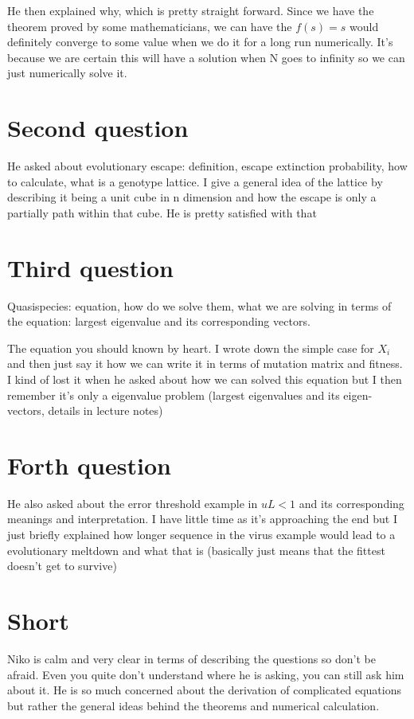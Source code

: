 \documentclass[a4paper,12pt]{article}
\begin{document}
He then explained why, which is pretty straight forward. Since we have the theorem proved by some mathematicians, we can have the $f(s) = s$ would definitely converge to some value when we do it for a long run numerically. It's because we are certain this will have a solution when N goes to infinity so we can just numerically solve it.

\section{Second question}
He asked about evolutionary escape: definition, escape extinction probability, how to calculate, what is a genotype lattice. I give a general idea of the lattice by describing it being a unit cube in n dimension and how the escape is only a partially path within that cube. He is pretty satisfied with that

\section{Third question}
Quasispecies: equation, how do we solve them, what we are solving in terms of the equation: largest eigenvalue and its corresponding vectors.

The equation you should known by heart. I wrote down the simple case for $X_i$ and then just say it how we can write it in terms of mutation matrix and fitness. I kind of lost it when he asked about how we can solved this equation but I then remember it's only a eigenvalue problem (largest eigenvalues and its eigen-vectors, details in lecture notes) 

\section{Forth question}
He also asked about the error threshold example in $uL < 1$ and its corresponding meanings and interpretation. I have little time as it's approaching the end but I just briefly explained how longer sequence in the virus example would lead to a evolutionary meltdown and what that is (basically just means that the fittest doesn't get to survive)

\section{Short}

Niko is calm and very clear in terms of describing the questions so don't be afraid. Even you quite don't understand where he is asking, you can still ask him about it. He is so much concerned about the derivation of complicated equations but rather the general ideas behind the theorems and numerical calculation.
\end{document}

